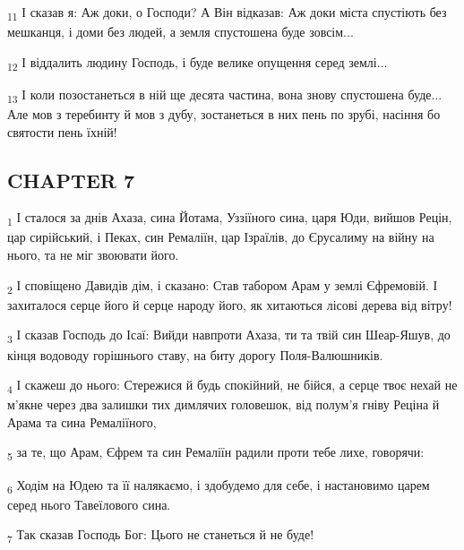 \begin{tcolorbox}
\textsubscript{11} І сказав я: Аж доки, о Господи? А Він відказав: Аж доки міста спустіють без мешканця, і доми без людей, а земля спустошена буде зовсім...
\end{tcolorbox}
\begin{tcolorbox}
\textsubscript{12} І віддалить людину Господь, і буде велике опущення серед землі...
\end{tcolorbox}
\begin{tcolorbox}
\textsubscript{13} І коли позостанеться в ній ще десята частина, вона знову спустошена буде... Але мов з теребинту й мов з дубу, зостанеться в них пень по зрубі, насіння бо святости пень їхній!
\end{tcolorbox}
\subsection{CHAPTER 7}
\begin{tcolorbox}
\textsubscript{1} І сталося за днів Ахаза, сина Йотама, Уззіїного сина, царя Юди, вийшов Рецін, цар сирійський, і Пеках, син Ремаліїн, цар Ізраїлів, до Єрусалиму на війну на нього, та не міг звоювати його.
\end{tcolorbox}
\begin{tcolorbox}
\textsubscript{2} І сповіщено Давидів дім, і сказано: Став табором Арам у землі Єфремовій. І захиталося серце його й серце народу його, як хитаються лісові дерева від вітру!
\end{tcolorbox}
\begin{tcolorbox}
\textsubscript{3} І сказав Господь до Ісаї: Вийди навпроти Ахаза, ти та твій син Шеар-Яшув, до кінця водоводу горішнього ставу, на биту дорогу Поля-Валюшників.
\end{tcolorbox}
\begin{tcolorbox}
\textsubscript{4} І скажеш до нього: Стережися й будь спокійний, не бійся, а серце твоє нехай не м'якне через два залишки тих димлячих головешок, від полум'я гніву Реціна й Арама та сина Ремаліїного,
\end{tcolorbox}
\begin{tcolorbox}
\textsubscript{5} за те, що Арам, Єфрем та син Ремаліїн радили проти тебе лихе, говорячи:
\end{tcolorbox}
\begin{tcolorbox}
\textsubscript{6} Ходім на Юдею та її налякаємо, і здобудемо для себе, і настановимо царем серед нього Тавеїлового сина.
\end{tcolorbox}
\begin{tcolorbox}
\textsubscript{7} Так сказав Господь Бог: Цього не станеться й не буде!
\end{tcolorbox}
